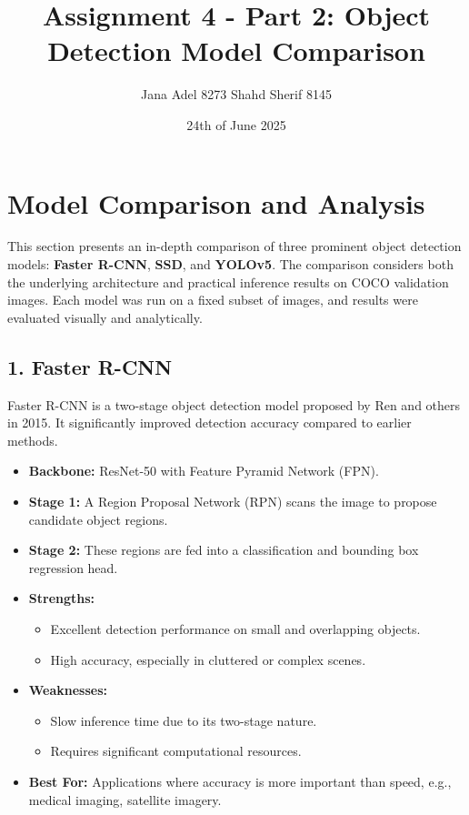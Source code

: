 \documentclass[12pt]{article}
\title{Assignment 4 - Part 2: Object Detection Model Comparison}
\author{Jana Adel 8273 Shahd Sherif 8145}
\date{24th of June 2025}
\begin{document}
\maketitle

\section*{Model Comparison and Analysis}

This section presents an in-depth comparison of three prominent object detection models: \textbf{Faster R-CNN}, \textbf{SSD}, and \textbf{YOLOv5}. The comparison considers both the underlying architecture and practical inference results on COCO validation images. Each model was run on a fixed subset of images, and results were evaluated visually and analytically.

\subsection*{1. Faster R-CNN}
Faster R-CNN is a two-stage object detection model proposed by Ren and others in 2015. It significantly improved detection accuracy compared to earlier methods.

\begin{itemize}
    \item \textbf{Backbone:} ResNet-50 with Feature Pyramid Network (FPN).
    \item \textbf{Stage 1:} A Region Proposal Network (RPN) scans the image to propose candidate object regions.
    \item \textbf{Stage 2:} These regions are fed into a classification and bounding box regression head.
    \item \textbf{Strengths:} 
    \begin{itemize}
        \item Excellent detection performance on small and overlapping objects.
        \item High accuracy, especially in cluttered or complex scenes.
    \end{itemize}
    \item \textbf{Weaknesses:}
    \begin{itemize}
        \item Slow inference time due to its two-stage nature.
        \item Requires significant computational resources.
    \end{itemize}
    \item \textbf{Best For:} Applications where accuracy is more important than speed, e.g., medical imaging, satellite imagery.
\end{itemize}
\end{document}

